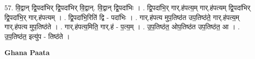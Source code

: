 \documentclass[17pt]{extarticle}
\begin{document}
57. वि॒द्वान् द्वि॒पदा॑भिर् द्वि॒पदा॑भिर् वि॒द्वान्. वि॒द्वान् द्वि॒पदा॑भिः । . द्वि॒पदा॑भि॒र् गार्.ह॑पत्य॒म् गार्.ह॑पत्यम् द्वि॒पदा॑भिर् द्वि॒पदा॑भि॒र् गार्.ह॑पत्यम् । . द्वि॒पदा॑भि॒रिति॑ द्वि - पदा॑भिः । . गार्.ह॑पत्य मुप॒तिष्ठ॑त उप॒तिष्ठ॑ते॒ गार्.ह॑पत्य॒म् गार्.ह॑पत्य मुप॒तिष्ठ॑ते । . गार्.ह॑पत्य॒मिति॒ गार्.ह॑ - प॒त्य॒म् । . उ॒प॒तिष्ठ॑त॒ ओप॒तिष्ठ॑त उप॒तिष्ठ॑त॒ आ । . उ॒प॒तिष्ठ॑त॒ इत्यु॑प - तिष्ठ॑ते । \newline

\textbf{Ghana Paata } \newline
\end{document}
